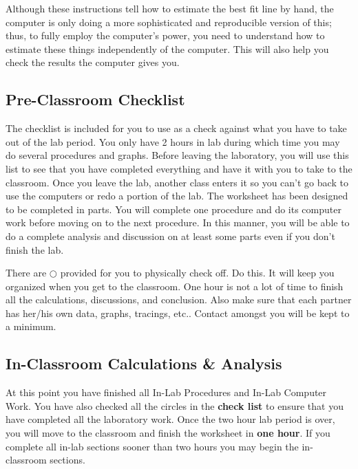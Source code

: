 Although these instructions tell how to estimate the best fit line by hand, the
computer is only doing a more sophisticated and reproducible version of this; 
thus, to fully employ the computer's power, you need to understand how to 
estimate these things independently of the computer. This will also help you 
check the results the computer gives you.

\subsection{Pre-Classroom Checklist}
The checklist is included for you to use as a check against what you have
to take out of the lab period.  You only have 2 hours in lab during which
time you may do several procedures and graphs.  Before leaving the laboratory, 
you will use this list to see that you have completed everything and have it
with you to take to the classroom.  Once you leave the lab, another class
enters it so you can't go back to use the computers or redo a portion of the 
lab.  The worksheet has been designed to be completed in parts.  You
will complete one procedure and do its computer work before moving on to 
the next procedure.  In this manner, you will be able to do a complete
analysis and discussion on at least some parts even if you don't finish
the lab.  

There are $\bigcirc$ provided for you to physically check off.  Do this.
It will keep you organized when you get to the classroom.  One hour
is not a lot of time to finish all the calculations, discussions, and 
conclusion.  Also make sure that each partner has her/his own data,
graphs, tracings, etc..  Contact amongst you will be kept to a minimum.


\subsection{In-Classroom Calculations \& Analysis}
At this point you have finished all In-Lab Procedures and In-Lab 
Computer Work.  You have also checked all the circles in the
{\bf check list} to ensure that you have completed all the laboratory
work.  Once the two hour lab period is over, you will move to the
classroom and finish the worksheet in {\bf one hour}.  If you
complete all in-lab sections sooner than two hours you may begin
the in-classroom sections.  

